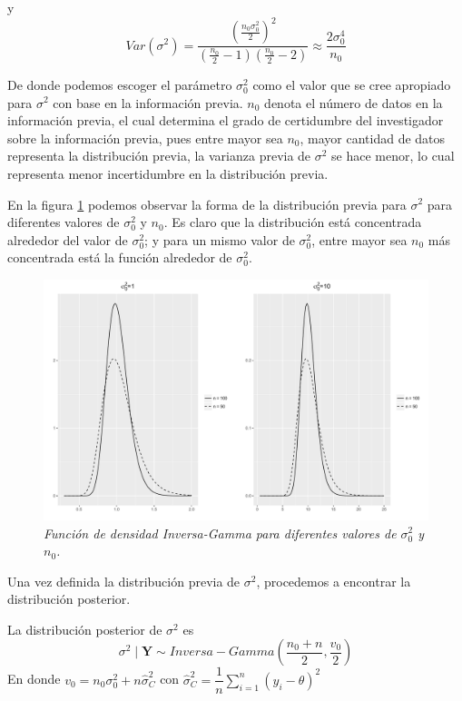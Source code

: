     y
    \begin{equation*}
    Var(\sigma^2)=\dfrac{\left(\frac{n_0\sigma^2_0}{2}\right)^2}{\left(\frac{n_0}{2}-1\right)\left(\frac{n_0}{2}-2\right)}\approx \dfrac{2\sigma^4_0}{n_0}
    \end{equation*}
    
    De donde podemos escoger el par\'ametro $\sigma^2_0$ como  el valor que se cree apropiado para $\sigma^2$ con base en la informaci\'on previa. $n_0$ denota el n\'umero de datos en la informaci\'on previa, el cual determina el grado de certidumbre del investigador sobre la informaci\'on previa, pues entre mayor sea $n_0$, mayor cantidad de datos representa la distribuci\'on previa, la varianza previa de $\sigma^2$ se hace menor, lo cual representa menor incertidumbre en la distribuci\'on previa.
    
    En la figura \ref{Priori_Sigma2} podemos observar la forma de la distribuci\'on previa para $\sigma^2$ para diferentes valores de $\sigma^2_0$ y $n_0$. Es claro que la distribuci\'on est\'a concentrada alrededor del valor de $\sigma^2_0$; y para un mismo valor de $\sigma^2_0$, entre mayor sea $n_0$ m\'as concentrada est\'a la funci\'on alrededor de $\sigma^2_0$.
    \begin{figure}[!h]
    \centering
    \includegraphics[scale=0.5]{Priori_Sigma2.pdf}
    \caption{\emph{Funci\'on de densidad Inversa-Gamma para diferentes valores de $\sigma^2_0$ y $n_0$.}}
    \label{Priori_Sigma2}
    \end{figure}
    
    Una vez definida la distribuci\'on previa de $\sigma^2$, procedemos a encontrar la distribuci\'on posterior.
    \begin{Res}\label{posterior_sigma2}
    La distribuci\'on posterior de $\sigma^2$ es
    \begin{equation*}
    \sigma^2  \mid \mathbf{Y} \sim Inversa-Gamma\left(\frac{n_0+n}{2},\frac{v_0}{2}\right)
    \end{equation*}
    En donde $v_0=n_0\sigma^2_0+n\hat{\sigma}^2_C$ con $\hat{\sigma}^2_C=\dfrac{1}{n}\sum_{i=1}^n(y_i-\theta)^2$
    \end{Res}
    
